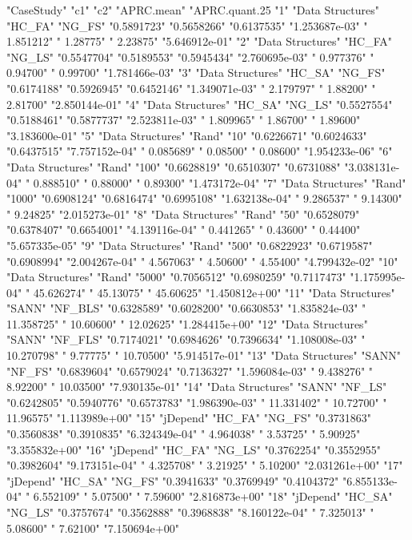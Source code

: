"CaseStudy" "c1" "c2" "APRC.mean" "APRC.quant.25%
"1" "Data Structures" "HC_FA" "NG_FS" "0.5891723" "0.5658266" "0.6137535" "1.253687e-03" "  1.851212" "  1.28775" "  2.23875" "5.646912e-01"
"2" "Data Structures" "HC_FA" "NG_LS" "0.5547704" "0.5189553" "0.5945434" "2.760695e-03" "  0.977376" "  0.94700" "  0.99700" "1.781466e-03"
"3" "Data Structures" "HC_SA" "NG_FS" "0.6174188" "0.5926945" "0.6452146" "1.349071e-03" "  2.179797" "  1.88200" "  2.81700" "2.850144e-01"
"4" "Data Structures" "HC_SA" "NG_LS" "0.5527554" "0.5188461" "0.5877737" "2.523811e-03" "  1.809965" "  1.86700" "  1.89600" "3.183600e-01"
"5" "Data Structures" "Rand" "10" "0.6226671" "0.6024633" "0.6437515" "7.757152e-04" "  0.085689" "  0.08500" "  0.08600" "1.954233e-06"
"6" "Data Structures" "Rand" "100" "0.6628819" "0.6510307" "0.6731088" "3.038131e-04" "  0.888510" "  0.88000" "  0.89300" "1.473172e-04"
"7" "Data Structures" "Rand" "1000" "0.6908124" "0.6816474" "0.6995108" "1.632138e-04" "  9.286537" "  9.14300" "  9.24825" "2.015273e-01"
"8" "Data Structures" "Rand" "50" "0.6528079" "0.6378407" "0.6654001" "4.139116e-04" "  0.441265" "  0.43600" "  0.44400" "5.657335e-05"
"9" "Data Structures" "Rand" "500" "0.6822923" "0.6719587" "0.6908994" "2.004267e-04" "  4.567063" "  4.50600" "  4.55400" "4.799432e-02"
"10" "Data Structures" "Rand" "5000" "0.7056512" "0.6980259" "0.7117473" "1.175995e-04" " 45.626274" " 45.13075" " 45.60625" "1.450812e+00"
"11" "Data Structures" "SANN" "NF_BLS" "0.6328589" "0.6028200" "0.6630853" "1.835824e-03" " 11.358725" " 10.60600" " 12.02625" "1.284415e+00"
"12" "Data Structures" "SANN" "NF_FLS" "0.7174021" "0.6984626" "0.7396634" "1.108008e-03" " 10.270798" "  9.77775" " 10.70500" "5.914517e-01"
"13" "Data Structures" "SANN" "NF_FS" "0.6839604" "0.6579024" "0.7136327" "1.596084e-03" "  9.438276" "  8.92200" " 10.03500" "7.930135e-01"
"14" "Data Structures" "SANN" "NF_LS" "0.6242805" "0.5940776" "0.6573783" "1.986390e-03" " 11.331402" " 10.72700" " 11.96575" "1.113989e+00"
"15" "jDepend" "HC_FA" "NG_FS" "0.3731863" "0.3560838" "0.3910835" "6.324349e-04" "  4.964038" "  3.53725" "  5.90925" "3.355832e+00"
"16" "jDepend" "HC_FA" "NG_LS" "0.3762254" "0.3552955" "0.3982604" "9.173151e-04" "  4.325708" "  3.21925" "  5.10200" "2.031261e+00"
"17" "jDepend" "HC_SA" "NG_FS" "0.3941633" "0.3769949" "0.4104372" "6.855133e-04" "  6.552109" "  5.07500" "  7.59600" "2.816873e+00"
"18" "jDepend" "HC_SA" "NG_LS" "0.3757674" "0.3562888" "0.3968838" "8.160122e-04" "  7.325013" "  5.08600" "  7.62100" "7.150694e+00"
